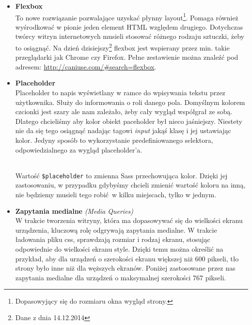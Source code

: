         \begin{itemize}
          \item \textbf{Flexbox}\\
            To nowe rozwiązanie pozwalające uzyskać płynny layout\footnote{Dopasowyjący się do rozmiaru okna wygląd strony.}. Pomaga również wyśrodkować w pionie jeden element HTML względem drugiego. Dotychczas twórcy witryn internetowych musieli stosować różnego rodzaju sztuczki, żeby to osiągnąć. Na dzień dzisiejszy\footnote{Dane z dnia 14.12.2014} flexbox jest wspierany przez min. takie przeglądarki jak Chrome czy Firefox. Pełne zestawienie można znaleźć pod adresem: \url{http://caniuse.com/\#search=flexbox}. \\
            

          \item \textbf{Placeholder}\\
            Placeholder to napis wyświetlany w ramce do wpisywania tekstu przez użytkownika. Służy do informowania o roli danego pola. Domyślnym kolorem czcionki jest szary ale nam zależało, żeby cały wygląd współgrał ze sobą. Dlatego chcieliśmy aby kolor obiekt paceholder był nieco jaśniejszy. Niestety nie da się tego osiągnąć nadając tagowi \emph{input} jakąś klasę i jej ustawiając kolor. Jedyny sposób to wykorzystanie predefiniowanego selektora, odpowiedzialnego za wygląd placeholder'a.

            \begin{code}
              
            \end{code}\\

            Wartość \texttt{\$placeholder} to zmienna Sass przechowująca kolor. Dzięki jej zastosowaniu, w przypadku gdybyśmy chcieli zmienić wartość koloru na inną, nie będziemy musieli tego robić w kilku miejscach, tylko w jednym.

          \item \textbf{Zapytania medialne} \emph{(Media Queries)}\\ 
            W trakcie tworzenia witryny, która ma dopasowywać się do wielkości ekranu urządzenia, kluczową rolę odgrywają zapytania medialne. W trakcie ładowania pliku css, sprawdzają rozmiar i rodzaj ekranu, stosując odpowiednie do wielkości ekranu style. Dzięki temu można określić na przykład, aby dla urządzeń o szerokości ekranu większej niż 600 pikseli, tło strony było inne niż dla węższych ekranów.
            Poniżej zastosowane przez nas zapytania medialne dla urządzeń o maksymalnej szerokości 767 pikseli.
            \begin{code}
              
            \end{code}
        \end{itemize}
